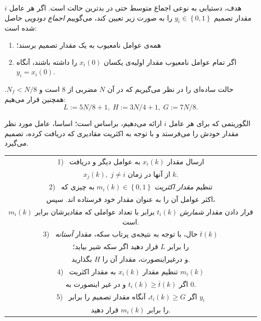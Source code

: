 \documentclass[12pt]{article} %
\begin{document}
هدف، دستیابی به نوعی اجماع متوسط حتی در بدترین حالت ​​است. اگر هر عامل 
$i$ 
مقدار  تصمیم 
$y_{i} \in \left\{ 0,1 \right\}$ 
را به صورت زیر تعیین کند، می‌گوییم 
\textit{اجماع دودویی} 
حاصل شده است:
\begin{enumerate}
	\item همه‌ی عوامل نامعیوب به یک مقدار تصمیم برسند؛
	\item اگر تمام عوامل نامعیوب مقدار اولیه‌ی یکسان 
	$x_{i}(0)$ 
	را داشته باشند، آنگاه 
	$y_{i} = x_{i}(0)$.
\end{enumerate}
حالت ساده‌ای را در نظر می‌گیریم که در آن 
$N$ 
مضربی از $8$ است و 
$N_{f} < N/8$. 
همچنین قرار می‌هیم:
\begin{equation*}
	L:=5N/8+1,\; H:=3N/4+1,\; G:=7N/8.
\end{equation*}

الگوریتمی که برای هر عامل $i$ ارائه می‌دهیم، براساس 
\cite{bib19} 
است؛ اساسا، عامل مورد نظر مقدار خودش را می‌فرستد و با توجه به اکثریت مقادیری که دریافت کرده، تصمیم می‌گیرد.

\begin{center}
	\begin{tabular}{||c||} 
		\hline
		1) \, ارسال مقدار 
		$x_{i}(k)$ 
		به عوامل دیگر و دریافت \\
		$x_{j}(k), \; j\neq i$ 
		از آنها در زمان 
		$k$.\\ [0.5ex] 
		\hline
		2) \, تنظیم 
		\textit{مقدار اکثریت} 
		$m_{i}(k)\in \left\{ 0,1 \right\}$ 
		به چیزی که \\
		اکثر عوامل آن را به عنوان مقدار خود فرستاده اند. سپس،\\
		 قرار دادن مقدار
		\textit{شمارش} 
		$t_{i}(k)$ 
		برابر با تعداد عواملی که مقادیرشان برابر 
		$m_{i}(k)$ 
		است.\\ 
		\hline
		3) \, حال، با توجه به نتیجه‌ی پرتاب سکه، مقدار 
		\textit{آستانه} 
		$\overline{t}(k)$ \\
		را برابر 
		$L$ 
		قرار دهید اگر سکه شیر بیاید؛\\
		 و درغیراینصورت، مقدار آن را 
		$H$ 
		بگذارید.\\
		\hline
		4) \, تنظیم مقدار 
		$x_{i}(k)$ 
		به مقدار اکثریت 
		$m_{i}(k)$ \\
		اگر  
		$t_{i}(k) \ge \overline{t}(k)$ 
		و در غیر اینصورت به $0$.\\
		\hline
		5) \, اگر 
		$t_{i}(k) \ge G$، 
		آنگاه مقدار تصمیم را برابر 
		$y_{i}$ \\
		را برابر 
		$m_{i}(k)$ 
		قرار دهید.\\
		\hline
	\end{tabular}
\end{center}
\end{document}
